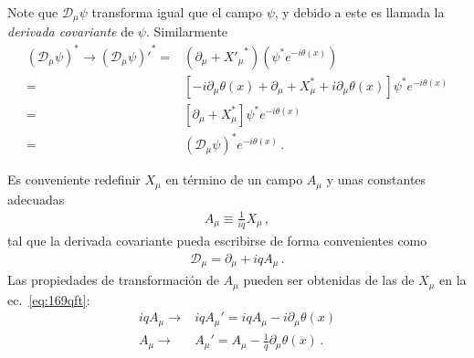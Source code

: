 Note que  $\mathcal{D}_\mu\psi$ transforma igual que el campo $\psi$, y debido a este es llamada la \emph{derivada covariante} de $\psi$.
Similarmente
\begin{align}
    (\mathcal{D}_\mu \psi)^*\to{\left(\mathcal{D}_\mu \psi\right)'}^*=&(\partial_\mu+{X'_\mu}^*) \left(\psi^*e^{-i\theta(x)}\right)\nonumber\\
=&\left[-i\partial_\mu \theta(x)+\partial_\mu+X_\mu^*+i\partial_\mu\theta(x) \right]\psi^*e^{-i\theta(x)}\nonumber\\
=&\left[\partial_\mu+X_\mu^*\right]\psi^*e^{-i\theta(x)}\nonumber\\
=&\left(\mathcal{D}_\mu\psi\right)^*e^{-i\theta(x)}\,.
\end{align}

Es conveniente redefinir $X_\mu$ en término de un campo  $A_\mu$ y unas constantes adecuadas
\begin{align}
  A_\mu\equiv\frac{1}{i q}X_\mu\,,
\end{align}
tal que la derivada covariante pueda escribirse de forma convenientes como
\begin{align}
\label{eq:170qft}
  \mathcal{D}_\mu=\partial_\mu+i q A_\mu\,.
\end{align}
Las propiedades de transformación de  $A_\mu$ pueden ser obtenidas de las de  $X_\mu$ en la ec.~\eqref{eq:169qft}: 
\begin{align}
\label{eq:159qft}
 i q A_\mu\to& i q A_\mu'=i q A_\mu-i \partial_\mu\theta(x)\nonumber\\
  A_\mu\to&  A_\mu'= A_\mu-\frac{1}{q} \partial_\mu\theta(x)\,.
\end{align}

